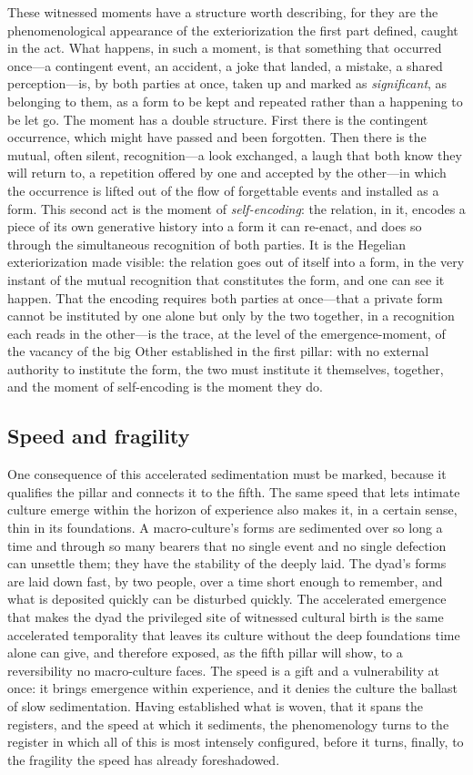 These witnessed moments have a structure worth describing, for they are the phenomenological appearance of the exteriorization the first part defined, caught in the act. What happens, in such a moment, is that something that occurred once---a contingent event, an accident, a joke that landed, a mistake, a shared perception---is, by both parties at once, taken up and marked as \emph{significant}, as belonging to them, as a form to be kept and repeated rather than a happening to be let go. The moment has a double structure. First there is the contingent occurrence, which might have passed and been forgotten. Then there is the mutual, often silent, recognition---a look exchanged, a laugh that both know they will return to, a repetition offered by one and accepted by the other---in which the occurrence is lifted out of the flow of forgettable events and installed as a form. This second act is the moment of \emph{self-encoding}: the relation, in it, encodes a piece of its own generative history into a form it can re-enact, and does so through the simultaneous recognition of both parties. It is the Hegelian exteriorization made visible: the relation goes out of itself into a form, in the very instant of the mutual recognition that constitutes the form, and one can see it happen. That the encoding requires both parties at once---that a private form cannot be instituted by one alone but only by the two together, in a recognition each reads in the other---is the trace, at the level of the emergence-moment, of the vacancy of the big Other established in the first pillar: with no external authority to institute the form, the two must institute it themselves, together, and the moment of self-encoding is the moment they do.

\subsection*{Speed and fragility}

One consequence of this accelerated sedimentation must be marked, because it qualifies the pillar and connects it to the fifth. The same speed that lets intimate culture emerge within the horizon of experience also makes it, in a certain sense, thin in its foundations. A macro-culture's forms are sedimented over so long a time and through so many bearers that no single event and no single defection can unsettle them; they have the stability of the deeply laid. The dyad's forms are laid down fast, by two people, over a time short enough to remember, and what is deposited quickly can be disturbed quickly. The accelerated emergence that makes the dyad the privileged site of witnessed cultural birth is the same accelerated temporality that leaves its culture without the deep foundations time alone can give, and therefore exposed, as the fifth pillar will show, to a reversibility no macro-culture faces. The speed is a gift and a vulnerability at once: it brings emergence within experience, and it denies the culture the ballast of slow sedimentation. Having established what is woven, that it spans the registers, and the speed at which it sediments, the phenomenology turns to the register in which all of this is most intensely configured, before it turns, finally, to the fragility the speed has already foreshadowed.
